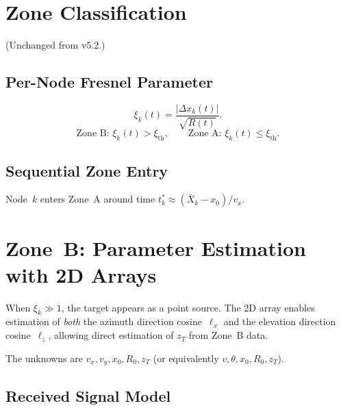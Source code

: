 \documentclass[11pt,a4paper]{article}
\begin{document}
\section{Zone Classification}
\label{sec:zones}

(Unchanged from v5.2.)

\subsection{Per-Node Fresnel Parameter}
\begin{equation}
  \xi_k(t) = \frac{|\Delta x_k(t)|}{\sqrt{R(t)}}.
  \label{eq:xi_k}
\end{equation}
\begin{equation}
  \text{Zone~B: } \xi_k(t)>\xi_{\mathrm{th}},
  \qquad
  \text{Zone~A: } \xi_k(t)\le\xi_{\mathrm{th}}.
  \label{eq:zone_def}
\end{equation}

\subsection{Sequential Zone Entry}
Node~$k$ enters Zone~A around time
$t_k^*\approx(\bar{X}_k-x_0)/v_x$.

\section{Zone~B: Parameter Estimation with 2D Arrays}
\label{sec:zone_b}

When $\xi_k\gg 1$, the target appears as a point source.  The 2D
array enables estimation of \emph{both} the azimuth direction
cosine~$\ell_x$ and the elevation direction cosine~$\ell_z$,
allowing direct estimation of $z_T$ from Zone~B data.

The unknowns are $v_x,v_y,x_0,R_0,z_T$
(or equivalently $v,\theta,x_0,R_0,z_T$).

\subsection{Received Signal Model}
\label{sec:zone_b_signal}
\end{document}
